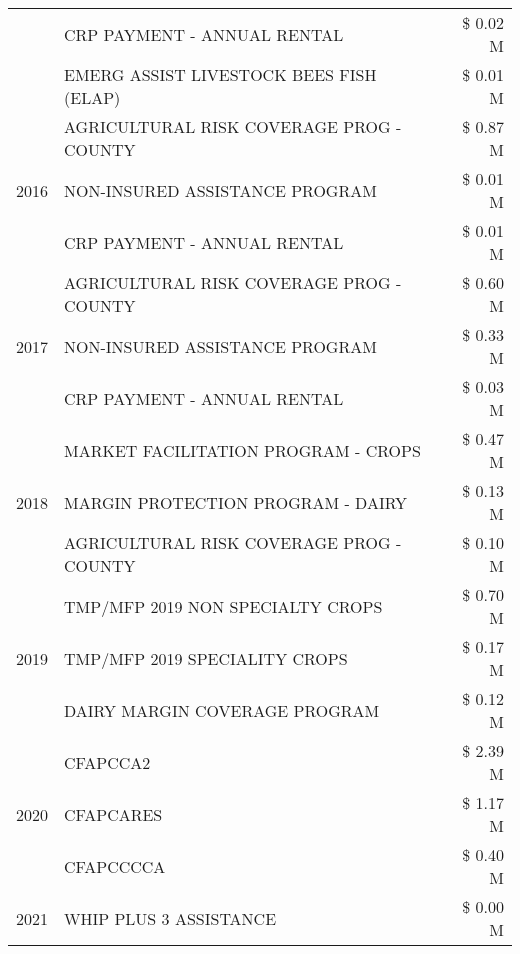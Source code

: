 \begin{tabular}{llr}
 & CRP PAYMENT - ANNUAL RENTAL & \$ 0.02 M \\
 & EMERG ASSIST LIVESTOCK BEES FISH (ELAP) & \$ 0.01 M \\
\cline{1-3}
\multirow[t]{3}{*}{2016} & AGRICULTURAL RISK COVERAGE PROG - COUNTY & \$ 0.87 M \\
 & NON-INSURED ASSISTANCE PROGRAM & \$ 0.01 M \\
 & CRP PAYMENT - ANNUAL RENTAL & \$ 0.01 M \\
\cline{1-3}
\multirow[t]{3}{*}{2017} & AGRICULTURAL RISK COVERAGE PROG - COUNTY & \$ 0.60 M \\
 & NON-INSURED ASSISTANCE PROGRAM & \$ 0.33 M \\
 & CRP PAYMENT - ANNUAL RENTAL & \$ 0.03 M \\
\cline{1-3}
\multirow[t]{3}{*}{2018} & MARKET FACILITATION PROGRAM - CROPS & \$ 0.47 M \\
 & MARGIN PROTECTION PROGRAM - DAIRY & \$ 0.13 M \\
 & AGRICULTURAL RISK COVERAGE PROG - COUNTY & \$ 0.10 M \\
\cline{1-3}
\multirow[t]{3}{*}{2019} & TMP/MFP 2019 NON SPECIALTY CROPS & \$ 0.70 M \\
 & TMP/MFP 2019 SPECIALITY CROPS & \$ 0.17 M \\
 & DAIRY MARGIN COVERAGE PROGRAM & \$ 0.12 M \\
\cline{1-3}
\multirow[t]{3}{*}{2020} & CFAPCCA2 & \$ 2.39 M \\
 & CFAPCARES & \$ 1.17 M \\
 & CFAPCCCCA & \$ 0.40 M \\
\cline{1-3}
2021 & WHIP PLUS 3 ASSISTANCE & \$ 0.00 M \\
\cline{1-3}
\bottomrule
\end{tabular}
